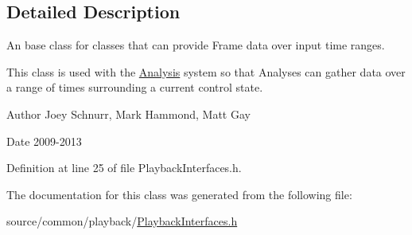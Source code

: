 

\subsection{Detailed Description}
An base class for classes that can provide Frame data over input time ranges. 

This class is used with the \hyperlink{class_picto_1_1_analysis}{Analysis} system so that Analyses can gather data over a range of times surrounding a current control state. \begin{DoxyAuthor}{Author}
Joey Schnurr, Mark Hammond, Matt Gay 
\end{DoxyAuthor}
\begin{DoxyDate}{Date}
2009-\/2013 
\end{DoxyDate}


Definition at line 25 of file Playback\-Interfaces.\-h.



The documentation for this class was generated from the following file\-:\begin{DoxyCompactItemize}
\item 
source/common/playback/\hyperlink{_playback_interfaces_8h}{Playback\-Interfaces.\-h}\end{DoxyCompactItemize}
